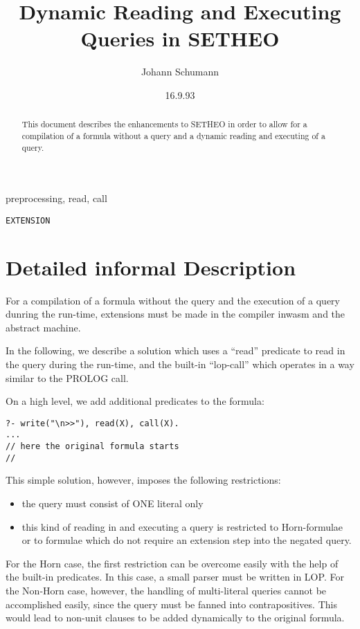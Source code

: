 

\title{Dynamic Reading and Executing Queries in SETHEO}
\author{Johann Schumann}
\date{16.9.93}



\maketitle

\begin{abstract}
This document describes the enhancements to SETHEO in order to allow for
a compilation of a formula without a query and a dynamic reading and
executing of a query.
\end{abstract}

  preprocessing, read, call

 {\tt EXTENSION}

\section{Detailed informal Description}

For a compilation of a formula without the query and the execution
of a query dunring the run-time, extensions must be made in the compiler
inwasm and the abstract machine.

In the following, we describe a solution which uses a ``read'' predicate
to read in the query during the run-time, and the built-in ``lop-call''
which operates in a way similar to the PROLOG call.

On a high level, we add additional predicates to the formula:

\begin{verbatim}
?- write("\n>>"), read(X), call(X).
...
// here the original formula starts
//
\end{verbatim}

This simple solution, however, imposes the following restrictions:

\begin{itemize}
\item
the query must consist of ONE literal only
\item
this kind of reading in and executing a query is restricted to Horn-formulae
or to formulae which do not require an extension step into the
negated query.
\end{itemize}

For the Horn case, the first restriction can be overcome easily with
the help of the built-in predicates. In this case, a small parser
must be written in LOP.
For the Non-Horn case, however, the handling of multi-literal queries
cannot be accomplished easily, since the query must be fanned
into contrapositives. This would lead to non-unit clauses to
be added dynamically to the original formula.

